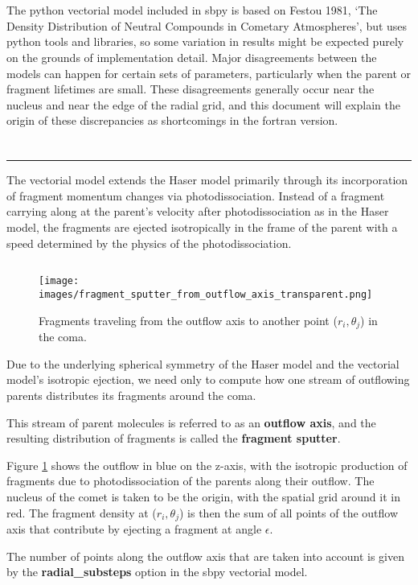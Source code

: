\documentclass[11pt]{article}
\newcommand{\modelterm}[1]{\textcolor{myred}{\textbf{#1}}}
\newcommand{\modeltermblue}[1]{\textcolor{myblue}{\textbf{#1}}}
\newcommand{\newproblem}[1]{\section*{\contour{mybblack}{\textcolor{myblack}{#1}}}}
\newcommand{\problempart}[1]{\subsection*{\contour{mybblack}{\textcolor{myblack}{#1}}}}
\begin{document}
\newpage

\newproblem{Fortran and Python Model Discrepancy Testing}
The python vectorial model included in sbpy is based on Festou 1981, `The Density Distribution of Neutral Compounds in Cometary Atmospheres', but uses python tools and libraries, so some variation in results might be expected purely on the grounds of implementation detail.
Major disagreements between the models can happen for certain sets of parameters, particularly when the parent or fragment lifetimes are small.
These disagreements generally occur near the nucleus and near the edge of the radial grid, and this document will explain the origin of these discrepancies as shortcomings in the fortran version.

\newproblem{Vectorial Model Geometry}

\hrule
\vspace{5mm}

The vectorial model extends the Haser model primarily through its incorporation of fragment momentum changes via photodissociation.
Instead of a fragment carrying along at the parent's velocity after photodissociation as in the Haser model, the fragments are ejected isotropically in the frame of the parent with a speed determined by the physics of the photodissociation.

\problempart{Outflow Axis}

\begin{multicols}{2}
  \begin{figure}[H]
    \texttt{[image: images/fragment\_sputter\_from\_outflow\_axis\_transparent.png]}
    \caption{Fragments traveling from the outflow axis to another point (\(r_i, \theta_j\)) in the coma.}
    \label{fig:outflow_sputter}
  \end{figure}

Due to the underlying spherical symmetry of the Haser model and the vectorial model's isotropic ejection, we need only to compute how one stream of outflowing parents distributes its fragments around the coma.

This stream of parent molecules is referred to as an \modeltermblue{outflow axis}, and the resulting distribution of fragments is called the \modelterm{fragment sputter}.

Figure \ref{fig:outflow_sputter} shows the outflow in blue on the z-axis, with the isotropic production of fragments due to photodissociation of the parents along their outflow.
The nucleus of the comet is taken to be the origin, with the spatial grid around it in red.
The fragment density at (\(r_i, \theta_j\)) is then the sum of all points of the outflow axis that contribute by ejecting a fragment at angle \(\epsilon\).

The number of points along the outflow axis that are taken into account is given by the \modelterm{radial\_substeps} option in the sbpy vectorial model.
\end{multicols}
\end{document}
